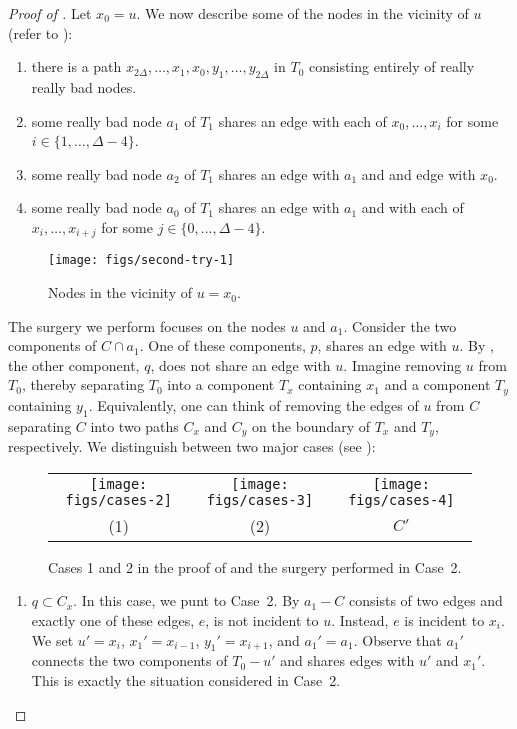 \documentclass[a4paper,UKenglish]{socg-lipics-v2019}
\begin{document}
\begin{proof}[Proof of ]
Let $x_0=u$. We now describe some of the nodes in the vicinity of $u$ (refer to ):
\begin{enumerate}
  \item there is a path
    $x_{2\Delta},\ldots,x_1,x_0,y_1,\ldots,y_{2\Delta}$
    in $T_0$ consisting entirely of really really bad nodes.
  \item some really bad node $a_1$ of $T_1$ shares an edge with each of
    $x_0,\ldots,x_i$ for some $i\in\{1,\ldots,\Delta-4\}$.
  \item some really bad node $a_2$ of $T_1$ shares an edge with $a_1$ and
    and edge with $x_0$. 
  \item some really bad node $a_0$ of $T_1$ shares an edge with $a_1$ and
    with each of $x_i,\ldots,x_{i+j}$ for some $j\in\{0,\ldots,\Delta-4\}$.
\end{enumerate}

\begin{figure}
   \begin{center}\texttt{[image: figs/second-try-1]}\end{center}
   \caption{Nodes in the vicinity of $u=x_0$.}
\end{figure}

The surgery we perform focuses on the nodes $u$ and $a_1$.  Consider
the two components of $C\cap a_1$. One of these components, $p$, shares
an edge with $u$.  By , the other component,
$q$, does not share an edge with $u$.  Imagine removing $u$ from $T_0$,
thereby separating $T_0$ into a component $T_x$ containing $x_1$ and a
component $T_y$ containing $y_1$.  Equivalently, one can think of removing
the edges of $u$ from $C$ separating $C$ into two paths $C_x$ and $C_y$
on the boundary of $T_x$ and $T_y$, respectively.  We distinguish between
two major cases (see ):

\begin{figure}
   \begin{center}
     \begin{tabular}{ccc}
       \texttt{[image: figs/cases-2]} &
       \texttt{[image: figs/cases-3]} &
       \texttt{[image: figs/cases-4]} \\
       (1) & (2) & $C'$
     \end{tabular}
   \end{center}
   \caption{Cases 1 and 2 in the proof of  and the surgery performed in Case~2.}
\end{figure}
\begin{enumerate}
   \item $q\subset C_x$.  In this case, we punt to Case~2. By
    $a_1-C$ consists of two edges and exactly
   one of these edges, $e$, is not incident to $u$. Instead, $e$ is
   incident to    $x_i$.  We set $u'=x_i$, $x_1'=x_{i-1}$, $y_1'=x_{i+1}$,
   and $a_1'=a_1$. Observe that $a_1'$ connects the two components of
   $T_0-u'$ and shares edges with $u'$ and $x_1'$. This is exactly the
   situation considered in Case~2.


\end{enumerate}
\end{proof}
\end{document}
